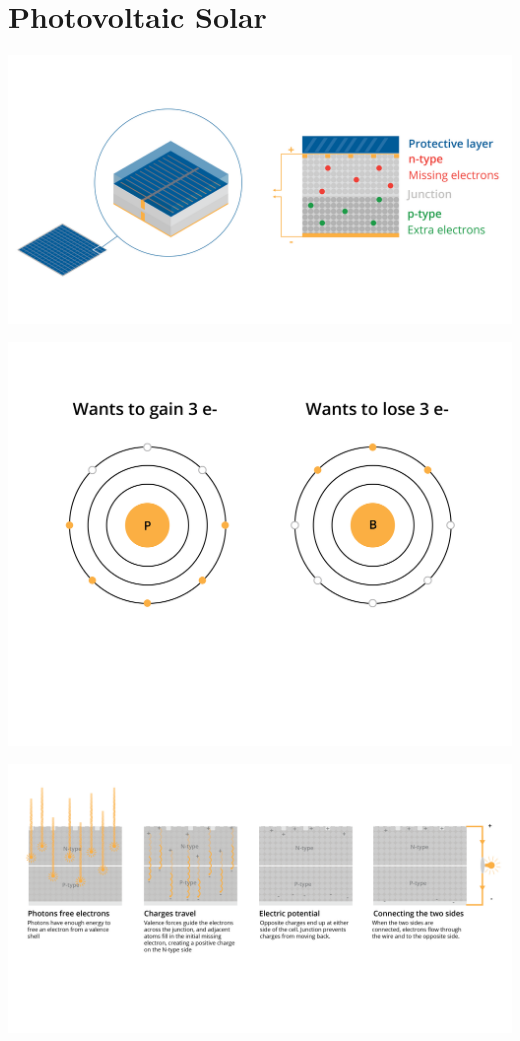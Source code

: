 \section{Photovoltaic Solar}


\includegraphics[width=.75\textwidth]{solarDiagram.png}

\includegraphics[width=.75\textwidth]{atomSolar.png}

\includegraphics[width=.75\textwidth]{solarProcess2.png}


